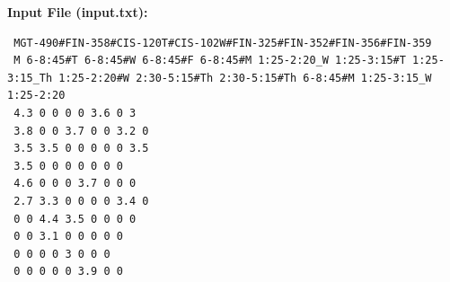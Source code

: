 \documentclass[paper=letter, fontsize=11pt]{scrartcl} %
\begin{document}
\vspace{5mm}

 \normalsize \textbf{Input File (input.txt):}
 \begin{lstlisting}
 MGT-490#FIN-358#CIS-120T#CIS-102W#FIN-325#FIN-352#FIN-356#FIN-359
 M 6-8:45#T 6-8:45#W 6-8:45#F 6-8:45#M 1:25-2:20_W 1:25-3:15#T 1:25-3:15_Th 1:25-2:20#W 2:30-5:15#Th 2:30-5:15#Th 6-8:45#M 1:25-3:15_W 1:25-2:20
 4.3 0 0 0 0 3.6 0 3
 3.8 0 0 3.7 0 0 3.2 0
 3.5 3.5 0 0 0 0 0 3.5
 3.5 0 0 0 0 0 0 0 
 4.6 0 0 0 3.7 0 0 0 
 2.7 3.3 0 0 0 0 3.4 0
 0 0 4.4 3.5 0 0 0 0 
 0 0 3.1 0 0 0 0 0 
 0 0 0 0 3 0 0 0 
 0 0 0 0 0 3.9 0 0
 \end{lstlisting}
\end{document}
